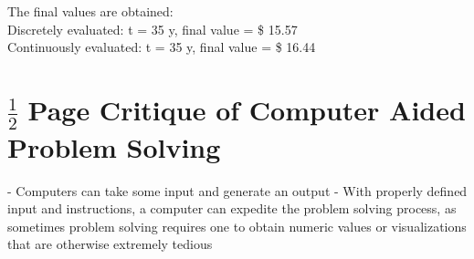 \documentclass[10pt]{report}
\begin{document}
    The final values are obtained:\\
    Discretely evaluated: t  = 35 y, final value = \$ 15.57\\
    Continuously evaluated: t = 35 y, final value = \$ 16.44

    \section*{$\frac{1}{2}$ Page Critique of Computer Aided Problem Solving}

    - Computers can take some input and generate an output
    - With properly defined input and instructions, a computer can expedite the problem solving process, as sometimes problem solving requires one to obtain numeric values or visualizations that are otherwise extremely tedious
\end{document}
